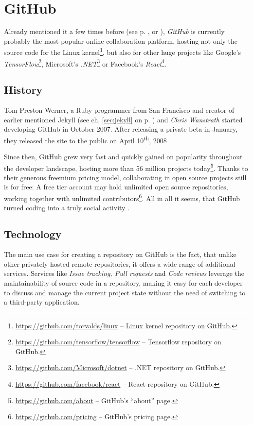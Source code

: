 \section{GitHub}
\label{sec:git-github}

Already mentioned it a few times before (see p. \pageref{sec:jekyll}, \pageref{sec:buildpipelines-markdown} or \pageref{sec:git}), \emph{GitHub} is currently probably the most popular online collaboration platform, hosting not only the source code for the Linux kernel\footnote{\url{https://github.com/torvalds/linux} -- Linux kernel repository on GitHub.}, but also for other huge projects like Google's \emph{TensorFlow}\footnote{\url{https://github.com/tensorflow/tensorflow} -- Tensorflow repository on GitHub.}, Microsoft's \emph{.NET}\footnote{\url{https://github.com/Microsoft/dotnet} -- .NET repository on GitHub.} or Facebook's \emph{React}\footnote{\url{https://github.com/facebook/react} -- React repository on GitHub.}.

\subsection{History}
\label{sec:github-history}
Tom Preston-Werner, a Ruby programmer from San Francisco and creator of earlier mentioned Jekyll (see ch. \ref{sec:jekyll} on p. \pageref{sec:jekyll}) and \emph{Chris Wanstrath} started developing GitHub in October 2007. After releasing a private beta in January, they released the site to the public on April 10\textsuperscript{th}, 2008 \cite{PrestonWerner2008githublaunch}.

Since then, GitHub grew very fast and quickly gained on popularity throughout the developer landscape, hosting more than 56 million projects today\footnote{\url{https://github.com/about} -- GitHub's ``about'' page.}. Thanks to their generous freemium pricing model, collaborating in open source projects still is for free: A free tier account may hold unlimited open source repositories, working together with unlimited contributors\footnote{\url{https://github.com/pricing} -- GitHub's pricing page.}. All in all it seems, that GitHub turned coding into a truly social activity \cite[416]{loeliger2012version}.

\subsection{Technology}
The main use case for creating a repository on GitHub is the fact, that unlike other privately hosted remote repositories, it offers a wide range of additional services. Services like \emph{Issue tracking, Pull requests} and \emph{Code reviews} leverage the maintainability of source code in a repository, making it easy for each developer to discuss and manage the current project state without the need of switching to a third-party application.

